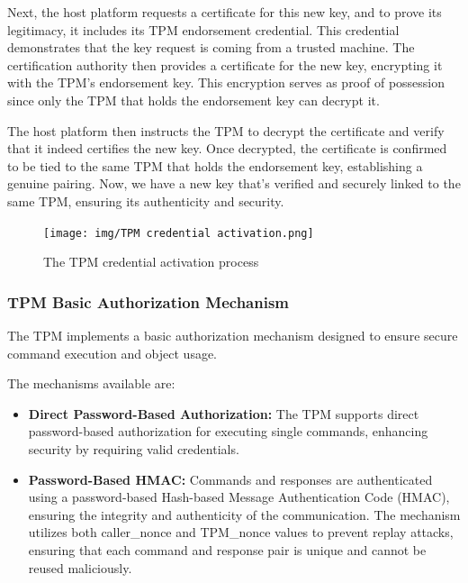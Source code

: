Next, the host platform requests a certificate for this new key, and
to prove its legitimacy, it includes its TPM endorsement credential.
This credential demonstrates that the key request is coming from a
trusted machine. The certification authority then provides a
certificate for the new key, encrypting it with the TPM's endorsement
key. This encryption serves as proof of possession since only the TPM
that holds the endorsement key can decrypt it.

The host platform then instructs the TPM to decrypt the certificate
and verify that it indeed certifies the new key. Once decrypted, the
certificate is confirmed to be tied to the same TPM that holds the
endorsement key, establishing a genuine pairing. Now, we have a new
key that’s verified and securely linked to the same TPM, ensuring its
authenticity and security.

\begin{figure}[H]
  \centering
  \texttt{[image: img/TPM credential
  activation.png]}
  \caption{The TPM credential activation process}
\end{figure}

\subsubsection{TPM Basic Authorization Mechanism}

The TPM implements a basic authorization mechanism designed to ensure
secure command execution and object usage. 

The mechanisms available are:
\begin{itemize}
  \item \textbf{Direct Password-Based Authorization:} The TPM
    supports direct password-based authorization for executing
    single commands, enhancing security by requiring valid
    credentials.

  \item \textbf{Password-Based HMAC:} Commands and responses are
    authenticated using a password-based Hash-based Message
    Authentication Code (HMAC), ensuring the integrity and
    authenticity of the communication.  The mechanism utilizes both
    caller\_nonce and TPM\_nonce values to prevent replay attacks,
    ensuring that each command and response pair is unique and
    cannot be reused maliciously.
\end{itemize}

